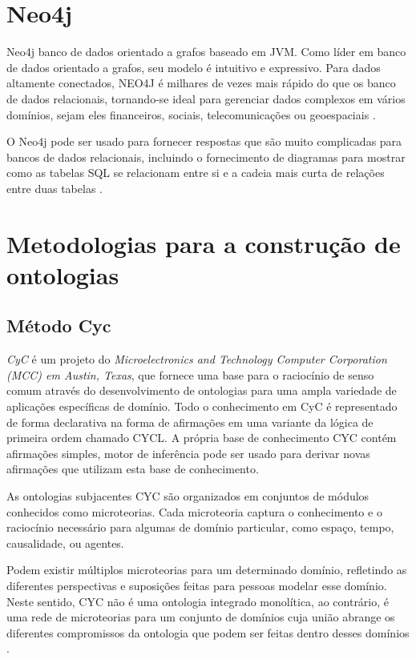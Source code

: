 \section{Neo4j}

Neo4j banco de dados orientado a grafos baseado em JVM. Como líder em banco de dados orientado a grafos, seu modelo é intuitivo e expressivo. Para dados altamente conectados, NEO4J é milhares de vezes mais rápido do que os banco de dados relacionais, tornando-se ideal para gerenciar dados complexos em vários domínios, sejam eles financeiros, sociais, telecomunicações ou geoespaciais \cite{weber2012programmatic}.

	O Neo4j pode ser usado para fornecer respostas que são muito complicadas para bancos de dados relacionais, incluindo o fornecimento de diagramas para mostrar como as tabelas SQL se relacionam entre si e a cadeia mais curta de relações entre duas tabelas \cite{neo4j}.



\section{Metodologias para a construção de ontologias}

\subsection{Método Cyc}

 \textit{CyC} é um projeto do \textit{Microelectronics and Technology Computer Corporation (MCC) em Austin, Texas},
 que fornece uma base para o raciocínio de senso comum através do desenvolvimento de ontologias para uma ampla 
 variedade de aplicações específicas de domínio. Todo o conhecimento em CyC é representado de forma declarativa na 
 forma de afirmações em uma variante da lógica de primeira ordem chamado CYCL. A própria base de conhecimento CYC 
 contém afirmações simples, motor de inferência pode ser usado para derivar novas afirmações que utilizam esta base
 de conhecimento.
 
As ontologias subjacentes CYC são organizados em conjuntos de módulos conhecidos como microteorias. Cada microteoria
captura o conhecimento e o raciocínio necessário para algumas de domínio particular, como espaço, tempo, causalidade,
ou agentes.

Podem existir múltiplos microteorias para um determinado domínio, refletindo as diferentes perspectivas e suposições
feitas para pessoas modelar esse domínio. Neste sentido, CYC não é uma ontologia integrado monolítica, ao contrário,
é uma rede de microteorias para um conjunto de domínios cuja união abrange os diferentes compromissos da ontologia que
podem ser feitas dentro desses domínios \cite{Andreia2010}.

